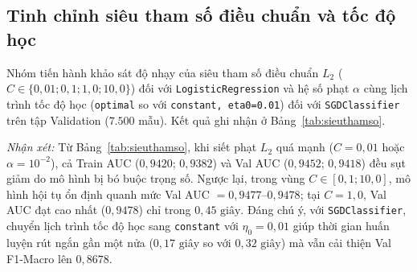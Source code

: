 \documentclass[12pt,a4paper,oneside]{report}
\begin{document}
\subsection{Tinh chỉnh siêu tham số điều chuẩn và tốc độ học}

Nhóm tiến hành khảo sát độ nhạy của siêu tham số điều chuẩn $L_2$ ($C \in \{0{,}01; 0{,}1; 1{,}0; 10{,}0\}$) đối với \texttt{LogisticRegression} và hệ số phạt $\alpha$ cùng lịch trình tốc độ học (\texttt{optimal} so với \texttt{constant, eta0=0.01}) đối với \texttt{SGDClassifier} trên tập Validation ($7.500$ mẫu). Kết quả ghi nhận ở Bảng~\ref{tab:sieuthamso}.

\begin{table}[H]
  \caption{Kết quả khảo sát và tinh chỉnh siêu tham số trên tập Validation ($N=7.500$).}
  \label{tab:sieuthamso}
\end{table}

\textit{Nhận xét:} Từ Bảng~\ref{tab:sieuthamso}, khi siết phạt $L_2$ quá mạnh ($C=0{,}01$ hoặc $\alpha=10^{-2}$), cả Train AUC ($0{,}9420$; $0{,}9382$) và Val AUC ($0{,}9452$; $0{,}9418$) đều sụt giảm do mô hình bị bó buộc trọng số. Ngược lại, trong vùng $C \in [0{,}1; 10{,}0]$, mô hình hội tụ ổn định quanh mức Val AUC $= 0{,}9477$--$0{,}9478$; tại $C=1{,}0$, Val AUC đạt cao nhất ($0{,}9478$) chỉ trong $0{,}45\text{ giây}$. Đáng chú ý, với \texttt{SGDClassifier}, chuyển lịch trình tốc độ học sang \texttt{constant} với $\eta_0 = 0{,}01$ giúp thời gian huấn luyện rút ngắn gần một nửa ($0{,}17\text{ giây}$ so với $0{,}32\text{ giây}$) mà vẫn cải thiện Val F1-Macro lên $0{,}8678$.
\end{document}
